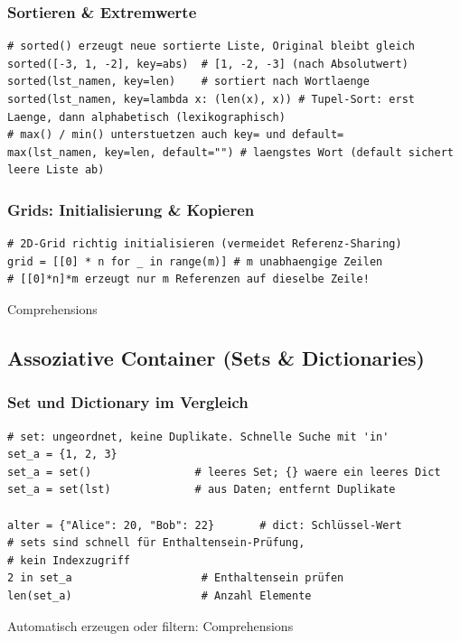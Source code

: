 \subsubsection{Sortieren \& Extremwerte}\label{sec:01-sortieren-mit-keys}
\begin{codebox}
\begin{lstlisting}[style=CodeExpert]
# sorted() erzeugt neue sortierte Liste, Original bleibt gleich
sorted([-3, 1, -2], key=abs)  # [1, -2, -3] (nach Absolutwert)
sorted(lst_namen, key=len)    # sortiert nach Wortlaenge
sorted(lst_namen, key=lambda x: (len(x), x)) # Tupel-Sort: erst Laenge, dann alphabetisch (lexikographisch)
# max() / min() unterstuetzen auch key= und default=
max(lst_namen, key=len, default="") # laengstes Wort (default sichert leere Liste ab)
\end{lstlisting}
\end{codebox}

\subsubsection{Grids: Initialisierung \& Kopieren}\label{sec:01-grid-init}
\begin{codebox}
\begin{lstlisting}[style=CodeExpert]
# 2D-Grid richtig initialisieren (vermeidet Referenz-Sharing)
grid = [[0] * n for _ in range(m)] # m unabhaengige Zeilen
# [[0]*n]*m erzeugt nur m Referenzen auf dieselbe Zeile!

\end{lstlisting}
Comprehensions 
\end{codebox}

\subsection{Assoziative Container (Sets \& Dictionaries)}\label{sec:01-sets-und-dictionaries}
\subsubsection{Set und Dictionary im Vergleich}\label{sec:01-collections-ungeordnete-container}
\begin{codebox}
\begin{lstlisting}[style=CodeExpert]
# set: ungeordnet, keine Duplikate. Schnelle Suche mit 'in'
set_a = {1, 2, 3}
set_a = set()                # leeres Set; {} waere ein leeres Dict
set_a = set(lst)             # aus Daten; entfernt Duplikate

alter = {"Alice": 20, "Bob": 22}       # dict: Schlüssel-Wert
# sets sind schnell für Enthaltensein-Prüfung,
# kein Indexzugriff
2 in set_a                    # Enthaltensein prüfen
len(set_a)                    # Anzahl Elemente
\end{lstlisting}
Automatisch erzeugen oder filtern: Comprehensions 
\end{codebox}

